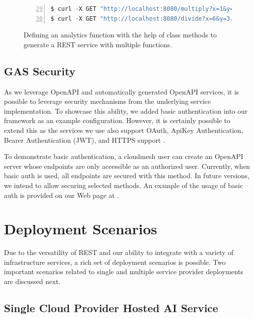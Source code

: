 \begin{figure}[htb]
\bigskip

\begin{lstlisting}[language=Python,
                   firstnumber=29,
                   basicstyle=\ttfamily\FONT,
                   numbers=left,                   
                   numbersep=5pt,
                   xleftmargin=5mm]
$ curl -X GET "http://localhost:8080/multiply?x=1&y=2" -H "accept: text/plain"
$ curl -X GET "http://localhost:8080/divide?x=6&y=3.14" -H "accept: text/plain"
\end{lstlisting}

\caption{Defining an analytics function with the help of class methods to generate a REST service with multiple functions.}
\label{fig:class-curl}

\end{figure}


\subsection{GAS Security}

As we leverage OpenAPI and automatically generated OpenAPI services,
it is possible to leverage security mechanisms from the underlying
service implementation. To showcase this ability, we added basic
authentication into our framework as an example
configuration. However, it is certainly possible to extend this as the
services we use also support OAuth, ApiKey Authentication, Bearer
Authentication (JWT), and HTTPS
support \cite{connexion-security}\cite{cloudmesh-openapi}.

To demonstrate basic authentication, a cloudmesh user can create an
OpenAPI server whose endpoints are only accessible as an authorized
user. Currently, when basic auth is used, all endpoints are secured
with this method. In future versions, we intend to allow securing
selected methods.  An example of the usage of basic auth is provided
on our Web page at \cite{www-cloudmesh-openapi-security}.

\section{Deployment Scenarios}

Due to the versatility of REST and our ability to integrate with a
variety of infrastructure services, a rich set of deployment scenarios
is possible. Two important scenarios related to single and multiple
service provider deployments are discussed next.

\subsection{Single Cloud Provider Hosted AI Service}

